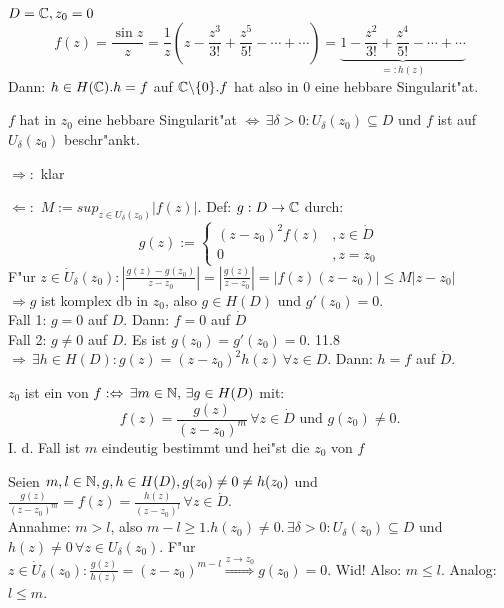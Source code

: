 \documentclass[a4paper,twoside,DIV15,BCOR12mm]{scrbook}
\begin{document}
\begin{beispiel}
$D=\mathbb{C}, z_0=0$
\[
f(z) = \frac{\sin z}{z} = \frac1z\left(z - \frac{z^3}{3!} + \frac{z^5}{5!} - \cdots + \cdots \right) = \underbrace{1 - \frac{z^2}{3!} + \frac{z^4}{5!} - \cdots + \cdots}_{=:h(z)}
\]
Dann: $h \in H(\mathbb{C}). h=f$ auf $\mathbb{C} \backslash\{0\}. f$ hat also in $0$ eine hebbare Singularit"at.
\end{beispiel}

\begin{satz}
$f$ hat in $z_0$ eine hebbare Singularit"at $\Leftrightarrow \, \exists \delta > 0: U_{\delta}(z_0) \subseteq D$ und $f$ ist auf $U_{\delta}(z_0)$ beschr"ankt.
\end{satz}

\begin{beweis}
\item[$\Rightarrow:$] klar
\item[$\Leftarrow:$] $M:=sup_{z \in U_{\delta}(z_0)} |f(z)|$. Def: $g: D \rightarrow \mathbb{C}$ durch:
\[
g(z) := \begin{cases} (z-z_0)^2f(z) &, z \in \dot{D} \\
0 &, z=z_0 \end{cases}
\]
F"ur $z \in \dot{U}_{\delta}(z_0): \left| \frac{g(z)-g(z_0)}{z-z_0} \right| = \left| \frac{g(z)}{z-z_0} \right| = |f(z)(z-z_0)| \leq M|z-z_0|$\\
$\Rightarrow g$ ist komplex db in $z_0$, also $g \in H(D)$ und $g'(z_0) = 0$.\\
Fall 1: $g = 0$ auf $D$. Dann: $f=0$ auf $\dot{D}$\\
Fall 2: $g \not= 0$ auf $D$. Es ist $g(z_0) = g'(z_0) = 0.$ 11.8 $\Rightarrow \, \exists h \in H(D): g(z) = (z-z_0)^2 h(z) \, \forall z \in D.$ Dann: $h=f$ auf $\dot{D}$.
\end{beweis}

\begin{satz}
$z_0$ ist ein  von $f : \Leftrightarrow \,\exists m \in \mathbb{N}, \, \exists g \in H(D)$ mit:
\[
f(z) = \frac{g(z)}{(z-z_0)^m} \, \forall z \in \dot{D} \mbox{ und } g(z_0) \not= 0.
\]
I. d. Fall ist $m$ eindeutig bestimmt und hei"st die  $z_0$ von $f$
\end{satz}

\begin{beweis}
Seien $m,l \in \mathbb{N}, g,h \in H(D), g(z_0) \not= 0 \not= h(z_0)$ und $\frac{g(z)}{(z-z_0)^m} = f(z) = \frac{h(z)}{(z-z_0)^l} \, \forall z \in \dot{D}.$\\
Annahme: $m > l$, also $m-l \geq 1. h(z_0) \not= 0. \, \exists \delta > 0: U_{\delta}(z_0) \subseteq D$ und $h(z) \not= 0 \, \forall z \in U_{\delta}(z_0).$ F"ur $z \in \dot{U}_{\delta}(z_0): \frac{g(z)}{h(z)} = (z-z_0)^{m-l} \stackrel{z \rightarrow z_0}{\Rightarrow} g(z_0) = 0$. Wid! Also: $m \leq l$. Analog: $l \leq m$.
\end{beweis}
\end{document}
